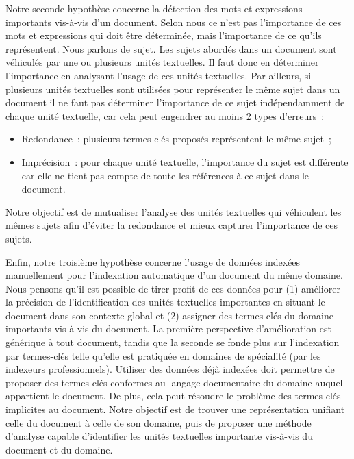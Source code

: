     Notre seconde hypothèse concerne la détection des mots et expressions
    importants vis-à-vis d'un document. Selon nous ce n'est pas l'importance de
    ces mots et expressions qui doit être déterminée, mais l'importance de ce
    qu'ils représentent. Nous parlons de sujet.
    Les sujets abordés dans un document sont véhiculés par une ou
    plusieurs unités textuelles. Il faut donc en déterminer l'importance en analysant
    l'usage de ces unités textuelles. Par ailleurs, si plusieurs unités
    textuelles sont utilisées pour représenter le même sujet dans un document il
    ne faut pas déterminer l'importance de ce sujet indépendamment de chaque
    unité textuelle, car cela peut engendrer au moins 2 types d'erreurs~:
    \begin{itemize}
      \item{Redondance~: plusieurs termes-clés proposés représentent le
            même sujet~;}
      \item{Imprécision~: pour chaque unité textuelle, l'importance du sujet est
            différente car elle ne tient pas compte de toute les références à ce
            sujet dans le document.}
    \end{itemize}
    Notre objectif est de mutualiser l'analyse des unités textuelles qui
    véhiculent les mêmes sujets afin d'éviter la redondance et mieux capturer
    l'importance de ces sujets.
    
    Enfin, notre troisième hypothèse concerne l'usage de données indexées
    manuellement pour l'indexation automatique d'un document du même domaine. Nous pensons qu'il est possible de tirer profit de ces données
    pour (1) améliorer la précision de l'identification des unités textuelles
    importantes en situant le document dans son contexte global et (2)
    assigner des termes-clés du domaine importants vis-à-vis du document.
    La première perspective d'amélioration est générique à tout document, tandis
    que la seconde se fonde plus sur l'indexation par termes-clés telle qu'elle
    est pratiquée en
    domaines de spécialité (par les indexeurs professionnels). Utiliser des
    données déjà indexées doit permettre de proposer des termes-clés conformes
    au langage documentaire du domaine auquel appartient le
    document. De plus, cela peut résoudre le problème des termes-clés implicites
    au document.
    Notre objectif est de trouver une représentation unifiant celle du
    document à celle de son domaine, puis de proposer une méthode d'analyse
    capable d'identifier les unités textuelles importante vis-à-vis du document
    et du domaine.


